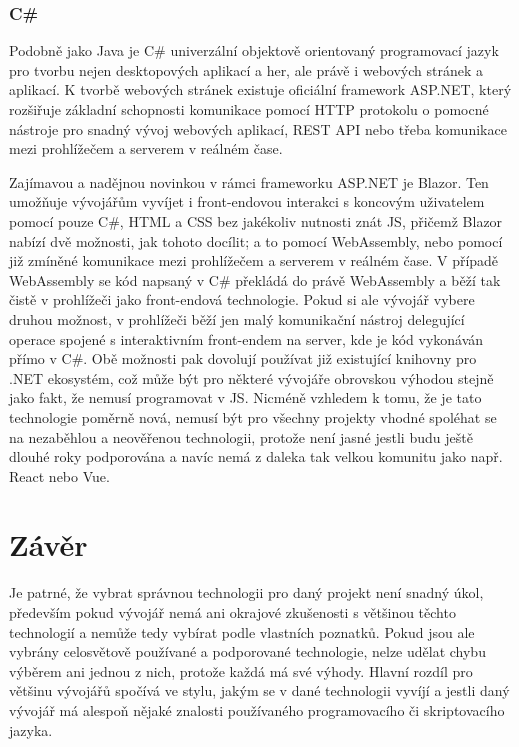 		\subsubsection{C\#}

		Podobně jako Java je C\# univerzální objektově orientovaný programovací jazyk pro tvorbu nejen
		desktopových aplikací a her, ale právě i webových stránek a aplikací.
		K tvorbě webových stránek existuje oficiální framework ASP.NET, který rozšiřuje základní schopnosti
		komunikace pomocí \Ac{HTTP} protokolu o pomocné nástroje pro snadný vývoj webových aplikací, \Ac{REST} API nebo třeba
		komunikace mezi prohlížečem a serverem v reálném čase. \cite{asp_net}

		Zajímavou a nadějnou novinkou v rámci frameworku ASP.NET je Blazor.
		Ten umožňuje vývojářům vyvíjet i front-endovou interakci s koncovým uživatelem pomocí pouze C\#, \Ac{HTML} a \Ac{CSS}
		bez jakékoliv nutnosti znát \ac{JS}, přičemž Blazor nabízí dvě možnosti, jak tohoto docílit; a to pomocí
		WebAssembly, nebo pomocí již zmíněné komunikace mezi prohlížečem a serverem v reálném čase.
		V případě WebAssembly se kód napsaný v C\# překládá do právě WebAssembly a běží tak čistě v prohlížeči
		jako front-endová technologie.
		Pokud si ale vývojář vybere druhou možnost, v prohlížeči běží jen malý komunikační nástroj delegující operace
		spojené s interaktivním front-endem na server, kde je kód vykonáván přímo v C\#.
		Obě možnosti pak dovolují používat již existující knihovny pro .NET ekosystém, což může být pro některé vývojáře
		obrovskou výhodou stejně jako fakt, že nemusí programovat v \ac{JS}.
		Nicméně vzhledem k tomu, že je tato technologie poměrně nová, nemusí být pro všechny projekty vhodné spoléhat
		se na nezaběhlou a neověřenou technologii, protože není jasné jestli budu ještě dlouhé roky podporována a
		navíc nemá z daleka tak velkou komunitu jako např. React nebo Vue. \cite{blazor}

\section{Závěr}

Je patrné, že vybrat správnou technologii pro daný projekt není snadný úkol, především pokud vývojář nemá ani okrajové
zkušenosti s většinou těchto technologií a nemůže tedy vybírat podle vlastních poznatků.
Pokud jsou ale vybrány celosvětově používané a podporované technologie, nelze udělat chybu výběrem ani jednou z nich, protože
každá má své výhody.
Hlavní rozdíl pro většinu vývojářů spočívá ve stylu, jakým se v dané technologii vyvíjí a jestli daný vývojář má alespoň
nějaké znalosti používaného programovacího či skriptovacího jazyka.


